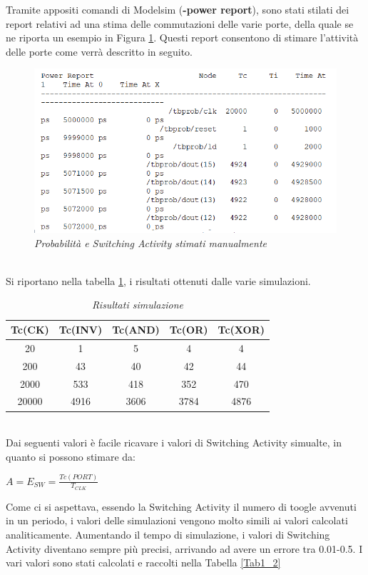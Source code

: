 Tramite appositi comandi di Modelsim (\textbf{-power report}), sono stati stilati dei report relativi ad una stima delle commutazioni delle varie porte, della quale se ne riporta un esempio in Figura \ref{fig1_2}. Questi report consentono di stimare l'attività delle porte come verrà descritto in seguito.\\
\begin{figure}[!htb]
	\centering
	\includegraphics[scale=1]{immagini/fig1_2}
	\caption{\textit{Probabilità e Switching Activity stimati manualmente}}
	\label{fig1_2}
\end{figure} \\
Si riportano nella tabella \ref{tab1}, i risultati ottenuti dalle varie simulazioni.
\begin{table}[!h]\footnotesize
	\centering
	\begin{tabular}{|c|c|c|c|c|}
		\hline
		\textbf{Tc(CK)} & \textbf{Tc(INV)}& \textbf{Tc(AND)}& \textbf{Tc(OR)} &\textbf{Tc(XOR)}\\
		\hline
		20 & 1  & 5& 4&4\\
		\hline
		200 &  43 &40&42& 44\\
		\hline
		2000& 533& 418&352&470\\
		\hline
		20000& 4916& 3606&3784&4876\\
		\hline
	\end{tabular}
	\caption{\textit{Risultati simulazione}}
	\label{tab1}
\end{table}\\
Dai seguenti valori è facile ricavare i valori di Switching Activity simualte, in quanto si possono stimare da:
\begin{center}
	$ A=E_{SW}=\frac{Tc(PORT)}{T_{CLK}} $
\end{center}
Come ci si aspettava, essendo la Switching Activity il numero di toogle avvenuti in un periodo, i valori delle simulazioni vengono molto simili ai valori calcolati analiticamente. Aumentando il tempo di simulazione, i valori di Switching Activity diventano sempre più precisi, arrivando ad avere un errore tra 0.01-0.5. I vari valori sono stati calcolati e raccolti nella Tabella \ref{Tab1_2}
